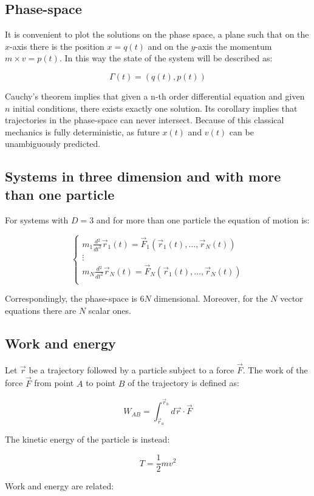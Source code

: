   \subsection{Phase-space}
  It is convenient to plot the solutions on the phase space, a plane such that on the $x$-axis there is the position $x=q(t)$ and on the $y$-axis the momentum $m\times v=p(t)$.
  In this way the state of the system will be described as:

  $$\Gamma(t) = (q(t),p(t))$$

  Cauchy's theorem implies that given a n-th order differential equation and given $n$ initial conditions, there exists exactly one solution.
  Its corollary implies that trajectories in the phase-space can never intersect.
  Because of this classical mechanics is fully deterministic, as future $x(t)$ and $v(t)$ can be unambiguously predicted.

  \subsection{Systems in three dimension and with more than one particle}
  For systems with $D=3$ and for more than one particle the equation of motion is:

  $$\begin{cases}
    m_1 \frac{d{^2}}{d{t^2}}\vec{r}_1(t) = \vec{F}_1(\vec{r}_1(t), \dots,\vec{r}_N(t))\\
    \vdots\\
    m_N \frac{d{^2}}{d{t^2}}\vec{r}_N(t) = \vec{F}_N(\vec{r}_1(t), \dots,\vec{r}_N(t))\\
  \end{cases}$$

  Correspondingly, the phase-space is $6N$ dimensional.
  Moreover, for the $N$ vector equations there are $N$ scalar ones.

  \subsection{Work and energy}
  Let $\vec{r}$ be a trajectory followed by a particle subject to a force $\vec{F}$.
  The work of the force $\vec{F}$ from point $A$ to point $B$ of the trajectory is defined as:

  $$W_{AB} = \int_{\vec{r}_a}^{\vec{r}_b}d \vec{r}\cdot \vec{F}$$

  The kinetic energy of the particle is instead:

  $$T = \frac{1}{2}mv^2$$

  Work and energy are related:

